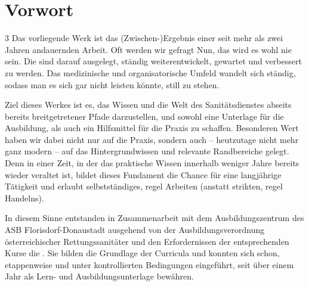 \documentclass[
ngerman,
paper=a4,
asymmetric,
fontsize=9pt,
draft=false,
parskip=half,
bibtotocnumbered,
footnotes=multiple,
toc=flat,
]{scrbook}
\newcommand{\MultiColListStart}[2]{\addtocontents{#1}{\protect\begin{multicols}{#2}}}
\begin{document}


\MultiColListStart{toc}{3}
\MultiColListStart{lofazit}{2}
\MultiColListStart{lomassnahmen}{2}



\layout

\clearpage
\section{Vorwort}

\begin{WidePar}
\begin{multicols}{3}
  Das vorliegende Werk ist das (Zwischen-)Ergebnis einer seit mehr als zwei Jahren
andauernden Arbeit. Oft werden wir gefragt  Nun, das wird es wohl nie sein. Die {\AASS} sind darauf ausgelegt,
ständig weiterentwickelt, gewartet und verbessert zu werden. Das medizinische
und organisatorische Umfeld wandelt sich ständig, sodass man es sich gar nicht
leisten könnte, still zu stehen.

Ziel dieses Werkes ist es, das Wissen und die Welt des Sanitätsdienstes abseits
bereits breitgetretener Pfade darzustellen, und sowohl eine Unterlage für die
Ausbildung, als auch ein Hilfsmittel für die Praxis zu schaffen.  Besonderen
Wert haben wir dabei nicht nur auf die Praxis, sondern auch -- heutzutage nicht
mehr ganz modern -- auf das Hintergrundwissen und relevante Randbereiche gelegt.
Denn in einer Zeit, in der das praktische Wissen innerhalb weniger Jahre bereits
wieder veraltet ist, bildet dieses Fundament die Chance für eine
langjährige Tätigkeit und erlaubt selbstständiges, regel Arbeiten
(anstatt strikten, regel Handelns). 

In diesem Sinne entstanden in Zusammenarbeit mit dem Ausbildungszentrum des ASB
Florisdorf-Donaustadt ausgehend von der Ausbildungsverordnung 
österreichischer Rettungssanitäter und den Erfordernissen der entsprechenden
Kurse die {\AASS}. Sie bilden die Grundlage der Curricula und konnten sich
schon, etappenweise und unter kontrollierten Bedingungen eingeführt, seit über
einem Jahr als Lern- und Ausbildungsunterlage
bewähren.
\end{multicols}
\end{WidePar}
\end{document}
